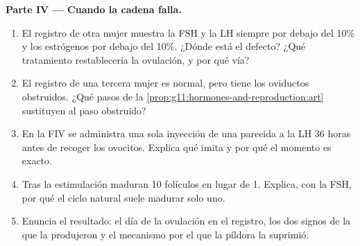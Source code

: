 \begin{problem}
\medskip
\noindent\textbf{Parte IV --- Cuando la cadena falla.}
\begin{enumerate}[resume]
  \item El registro de otra mujer muestra la FSH y la LH siempre por
        debajo del 10\% y los estrógenos por debajo del 10\%. ¿Dónde
        está el defecto? ¿Qué tratamiento restablecería la ovulación, y
        por qué vía?
  \item El registro de una tercera mujer es normal, pero tiene los
        oviductos obstruidos. ¿Qué pasos de la
        \cref{prop:g11:hormones-and-reproduction:art} sustituyen al
        paso obstruido?
  \item En la FIV se administra una sola inyección de una 
        parecida a la LH 36 horas antes de recoger los ovocitos.
        Explica qué imita y por qué el momento es exacto.
  \item Tras la estimulación maduran 10 folículos en lugar de 1.
        Explica, con la FSH, por qué el ciclo natural suele madurar
        solo uno.
  \item Enuncia el resultado: el día de la ovulación en el registro,
        los dos signos de la  que la produjeron y el
        mecanismo por el que la píldora la suprimió.
\end{enumerate}
\end{problem}
